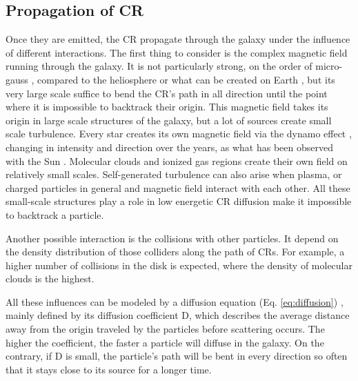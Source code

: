\subsection{Propagation of CR}

Once they are emitted, the CR propagate through the galaxy under the influence of different interactions.
The first thing to consider is the complex magnetic field running through the galaxy. It is not particularly strong, on the order of micro-gauss \cite{Daniel1975} \cite{Farrar2012}, compared to the heliosphere or what can be created on Earth \cite{Gleeson1968}, but its very large scale suffice to bend the CR's path in all direction until the point where it is impossible to backtrack their origin. This magnetic field takes its origin in large scale structures of the galaxy, but a lot of sources create small scale turbulence. Every star creates its own magnetic field via the dynamo effect \cite{Arlt2011}, changing in intensity and direction over the years, as what has been observed with the Sun \cite{Inceoglu2017}. Molecular clouds and ionized gas regions create their own field \cite{Crutcher2012} on relatively small scales. Self-generated turbulence can also arise when plasma, or charged particles in general and magnetic field interact with each other. All these small-scale structures play a role in low energetic CR diffusion make it impossible to backtrack a particle.

Another possible interaction is the collisions with other particles. It depend on the density distribution of those colliders along the path of CRs. For example, a higher number of collisions in the disk is expected, where the density of molecular clouds is the highest.

All these influences can be modeled by a diffusion equation (Eq. \ref{eq:diffusion}) \cite{Gazizov2006}, mainly defined by its diffusion coefficient D, which describes the average distance away from the origin traveled by the particles before scattering occurs. The higher the coefficient, the faster a particle will diffuse in the galaxy. On the contrary, if D is small, the particle's path will be bent in every direction so often that it stays close to its source for a longer time. 

